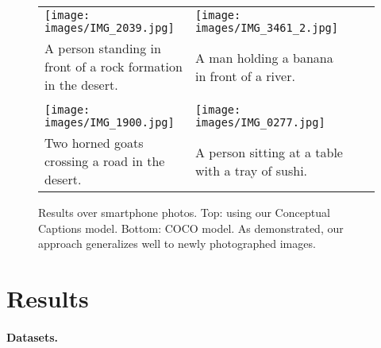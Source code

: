  \begin{figure}
  \centering
  \footnotesize

\renewcommand{\arraystretch}{1}
\setlength{\tabcolsep}{3pt}

  \centering
  \footnotesize
\begin{tabular}{p{\imagew} p{\imagew} p{\imagew}  p{\imagew}}


\texttt{[image: images/IMG\_2039.jpg]} &
\texttt{[image: images/IMG\_3461\_2.jpg]} \\
A person standing in front of a rock formation in the desert. & A man holding a banana in front of a river. \\
\\
\texttt{[image: images/IMG\_1900.jpg]} &
\texttt{[image: images/IMG\_0277.jpg]} \\
Two horned goats crossing a road in the desert. & A person sitting at a table with a tray of sushi. \\
 
\end{tabular}
\caption{Results over smartphone photos. Top: using our Conceptual Captions model. Bottom: COCO model. As demonstrated, our approach generalizes well to newly photographed images.}
\label{fig:real} 
\end{figure}



 

\section{Results}
\label{sec:res} 

\paragraph{Datasets.}


